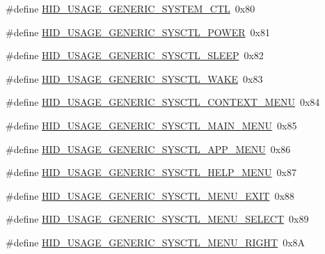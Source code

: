 \begin{DoxyCompactItemize}
\item 
\#define \hyperlink{group__USBD__HID_gad4265a946721f748c8d8afdddeadec45}{H\-I\-D\-\_\-\-U\-S\-A\-G\-E\-\_\-\-G\-E\-N\-E\-R\-I\-C\-\_\-\-S\-Y\-S\-T\-E\-M\-\_\-\-C\-T\-L}~0x80
\item 
\#define \hyperlink{group__USBD__HID_gaa12436658efedf9123a66b4b8e56475a}{H\-I\-D\-\_\-\-U\-S\-A\-G\-E\-\_\-\-G\-E\-N\-E\-R\-I\-C\-\_\-\-S\-Y\-S\-C\-T\-L\-\_\-\-P\-O\-W\-E\-R}~0x81
\item 
\#define \hyperlink{group__USBD__HID_gac73b2f6e789c3befc8a9acd70dcddee5}{H\-I\-D\-\_\-\-U\-S\-A\-G\-E\-\_\-\-G\-E\-N\-E\-R\-I\-C\-\_\-\-S\-Y\-S\-C\-T\-L\-\_\-\-S\-L\-E\-E\-P}~0x82
\item 
\#define \hyperlink{group__USBD__HID_ga638c72786880aa6c6af98e5bc45fe647}{H\-I\-D\-\_\-\-U\-S\-A\-G\-E\-\_\-\-G\-E\-N\-E\-R\-I\-C\-\_\-\-S\-Y\-S\-C\-T\-L\-\_\-\-W\-A\-K\-E}~0x83
\item 
\#define \hyperlink{group__USBD__HID_gaecbdbbdeb5d258f1e3a825422befb662}{H\-I\-D\-\_\-\-U\-S\-A\-G\-E\-\_\-\-G\-E\-N\-E\-R\-I\-C\-\_\-\-S\-Y\-S\-C\-T\-L\-\_\-\-C\-O\-N\-T\-E\-X\-T\-\_\-\-M\-E\-N\-U}~0x84
\item 
\#define \hyperlink{group__USBD__HID_gae2a1d26ba209e92cc8ce2865ef64dcdf}{H\-I\-D\-\_\-\-U\-S\-A\-G\-E\-\_\-\-G\-E\-N\-E\-R\-I\-C\-\_\-\-S\-Y\-S\-C\-T\-L\-\_\-\-M\-A\-I\-N\-\_\-\-M\-E\-N\-U}~0x85
\item 
\#define \hyperlink{group__USBD__HID_gaa73cbfdc8f380dcc3adda776b137bdf4}{H\-I\-D\-\_\-\-U\-S\-A\-G\-E\-\_\-\-G\-E\-N\-E\-R\-I\-C\-\_\-\-S\-Y\-S\-C\-T\-L\-\_\-\-A\-P\-P\-\_\-\-M\-E\-N\-U}~0x86
\item 
\#define \hyperlink{group__USBD__HID_gaa945bc70860e9c983e658077d494753b}{H\-I\-D\-\_\-\-U\-S\-A\-G\-E\-\_\-\-G\-E\-N\-E\-R\-I\-C\-\_\-\-S\-Y\-S\-C\-T\-L\-\_\-\-H\-E\-L\-P\-\_\-\-M\-E\-N\-U}~0x87
\item 
\#define \hyperlink{group__USBD__HID_gafc91a635055259c0d3a483d6c589c3be}{H\-I\-D\-\_\-\-U\-S\-A\-G\-E\-\_\-\-G\-E\-N\-E\-R\-I\-C\-\_\-\-S\-Y\-S\-C\-T\-L\-\_\-\-M\-E\-N\-U\-\_\-\-E\-X\-I\-T}~0x88
\item 
\#define \hyperlink{group__USBD__HID_gab64d10fd6ec3ea549ed4050169f93a4f}{H\-I\-D\-\_\-\-U\-S\-A\-G\-E\-\_\-\-G\-E\-N\-E\-R\-I\-C\-\_\-\-S\-Y\-S\-C\-T\-L\-\_\-\-M\-E\-N\-U\-\_\-\-S\-E\-L\-E\-C\-T}~0x89
\item 
\#define \hyperlink{group__USBD__HID_gac7f621deee3092ef3c2dd86dbb7b0ea8}{H\-I\-D\-\_\-\-U\-S\-A\-G\-E\-\_\-\-G\-E\-N\-E\-R\-I\-C\-\_\-\-S\-Y\-S\-C\-T\-L\-\_\-\-M\-E\-N\-U\-\_\-\-R\-I\-G\-H\-T}~0x8\-A

\end{DoxyCompactItemize}
